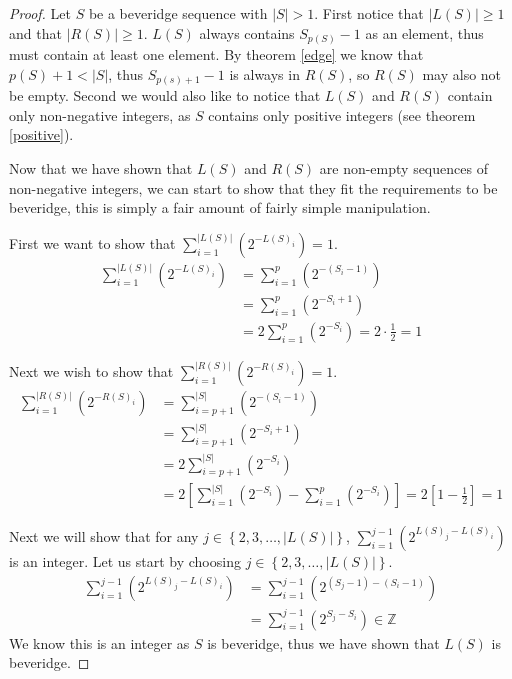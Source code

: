 \documentclass{macjourn}
\def\useLim{}
\newcommand{\sumfrom}[3]{\sum\useLim_{#1}^{#2} \left( {#3} \right)}
\newcommand{\set}[1]{\left\{ {#1} \right\}}
\newcommand{\cardinality}[1]{\left| #1 \right|}
\theoremstyle{definition}
\begin{document}
	
	\begin{proof}
		Let $S$ be a beveridge sequence with $\cardinality S > 1$. First notice that $\cardinality{L(S)} \ge 1$ and that $\cardinality{R(S)} \ge 1$. $L(S)$ always contains $S_{p(S)}-1$ as an element, thus must contain at least one element. By theorem \ref{edge} we know that $p(S) + 1 < \cardinality S$, thus $S_{p(s)+1}-1$ is always in $R(S)$, so $R(S)$ may also not be empty. Second we would also like to notice that $L(S)$ and $R(S)$ contain only non-negative integers, as $S$ contains only positive integers (see theorem \ref{positive}).
		
		Now that we have shown that $L(S)$ and $R(S)$ are non-empty sequences of non-negative integers, we can start to show that they fit the requirements to be beveridge, this is simply a fair amount of fairly simple manipulation.
		
		First we want to show that $\sumfrom{i=1}{\cardinality{L(S)}}{2^{-L(S)_i}} = 1$.
		\begin{align*}
			\sumfrom{i=1}{\cardinality{L(S)}}{2^{-L(S)_i}} 
			&= \sumfrom{i=1}{p}{2^{-(S_i-1)}}\\
			&= \sumfrom{i=1}{p}{2^{-S_i+1}} \\
			&= 2\sumfrom{i=1}{p}{2^{-S_i}}
			= 2\cdot\frac12
			= 1
		\end{align*}
		
		Next we wish to show that $\sumfrom{i=1}{\cardinality{R(S)}}{2^{-R(S)_i}} = 1$.
		\begin{align*}
			\sumfrom{i=1}{\cardinality{R(S)}}{2^{-R(S)_i}}
			&= \sumfrom{i=p+1}{\cardinality{S}}{2^{-(S_i-1)}} \\
			&= \sumfrom{i=p+1}{\cardinality S}{2^{-S_i+1}} \\
			&= 2\sumfrom{i=p+1}{\cardinality S}{2^{-S_i}} \\
			&= 2\left[\sumfrom{i=1}{\cardinality S}{2^{-S_i}} - \sumfrom{i=1}{p}{2^{-S_i}}\right]
			= 2\left[1-\frac12\right]
			= 1
		\end{align*}
		
		Next we will show that for any $j \in \set{2, 3, \ldots, \cardinality{L(S)}}$, $\sumfrom{i=1}{j-1}{2^{L(S)_j-L(S)_i}}$ is an integer. Let us start by choosing $j \in \set{2, 3, \ldots, \cardinality{L(S)}}$.
		\begin{align*}
			\sumfrom{i=1}{j-1}{2^{L(S)_j - L(S)_i}}
			&= \sumfrom{i=1}{j-1}{2^{(S_j - 1) - (S_i - 1)}} \\
			&= \sumfrom{i=1}{j-1}{2^{S_j - S_i}} \in \mathbb Z
		\end{align*}
		We know this is an integer as $S$ is beveridge, thus we have shown that $L(S)$ is beveridge.
		

\end{proof}
\end{document}
